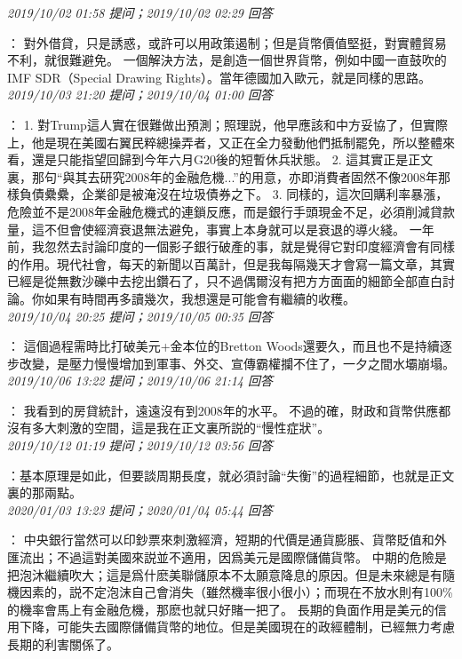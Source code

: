 \documentclass[twocolumn]{ctexart}
\begin{document}
\textit{\hfill\noindent\small 2019/10/02 01:58 提问；2019/10/02 02:29 回答}

：
對外借貸，只是誘惑，或許可以用政策遏制；但是貨幣價值堅挺，對實體貿易不利，就很難避免。
一個解決方法，是創造一個世界貨幣，例如中國一直鼓吹的IMF SDR（Special Drawing Rights）。當年德國加入歐元，就是同樣的思路。
\\

\textit{\hfill\noindent\small 2019/10/03 21:20 提问；2019/10/04 01:00 回答}

：
1. 對Trump這人實在很難做出預測；照理説，他早應該和中方妥協了，但實際上，他是現在美國右翼民粹總操弄者，又正在全力發動他們抵制罷免，所以整體來看，還是只能指望回歸到今年六月G20後的短暫休兵狀態。 
2. 這其實正是正文裏，那句“與其去研究2008年的金融危機...”的用意，亦即消費者固然不像2008年那樣負債纍纍，企業卻是被淹沒在垃圾債券之下。 
3. 同樣的，這次回購利率暴漲，危險並不是2008年金融危機式的連鎖反應，而是銀行手頭現金不足，必須削減貸款量，這不但會使經濟衰退無法避免，事實上本身就可以是衰退的導火綫。 
一年前，我忽然去討論印度的一個影子銀行破產的事，就是覺得它對印度經濟會有同樣的作用。現代社會，每天的新聞以百萬計，但是我每隔幾天才會寫一篇文章，其實已經是從無數沙礫中去挖出鑽石了，只不過偶爾沒有把方方面面的細節全部直白討論。你如果有時間再多讀幾次，我想還是可能會有繼續的收穫。
\\

\textit{\hfill\noindent\small 2019/10/04 20:25 提问；2019/10/05 00:35 回答}

：
這個過程需時比打破美元+金本位的Bretton Woods還要久，而且也不是持續逐步改變，是壓力慢慢增加到軍事、外交、宣傳霸權攔不住了，一夕之間水壩崩塌。
\\

\textit{\hfill\noindent\small 2019/10/06 13:22 提问；2019/10/06 21:14 回答}

：
我看到的房貸統計，遠遠沒有到2008年的水平。
不過的確，財政和貨幣供應都沒有多大刺激的空間，這是我在正文裏所説的“慢性症狀”。
\\

\textit{\hfill\noindent\small 2019/10/12 01:19 提问；2019/10/12 03:56 回答}

：基本原理是如此，但要談周期長度，就必須討論“失衡”的過程細節，也就是正文裏的那兩點。
\\

\textit{\hfill\noindent\small 2020/01/03 13:23 提问；2020/01/04 05:44 回答}

：
中央銀行當然可以印鈔票來刺激經濟，短期的代價是通貨膨脹、貨幣貶值和外匯流出；不過這對美國來説並不適用，因爲美元是國際儲備貨幣。 
中期的危險是把泡沐繼續吹大；這是爲什麽美聯儲原本不太願意降息的原因。但是未來總是有隨機因素的，説不定泡沫自己會消失（雖然機率很小很小）；而現在不放水則有100\%的機率會馬上有金融危機，那麽也就只好賭一把了。 
長期的負面作用是美元的信用下降，可能失去國際儲備貨幣的地位。但是美國現在的政經體制，已經無力考慮長期的利害關係了。
\\
\end{document}
